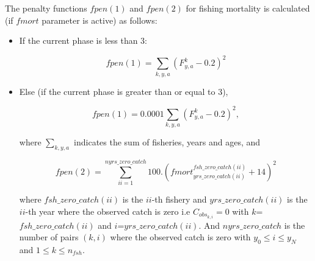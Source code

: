 \documentclass{article}
\begin{document}
The penalty functions $fpen(1)$ and $fpen(2)$ for fishing mortality is calculated (if $fmort$ parameter is active) as follows: 

\begin{itemize}
    \item If the current phase is less than 3:
    
    \begin{equation}
        fpen(1)=\sum_{k,y,a}(F^k_{y,a}-0.2)^2
    \end{equation}
    
    \item Else (if the current phase is greater than or equal to  3), 
    
    \begin{equation}
        fpen(1)=0.0001 \sum_{k,y,a}(F^k_{y,a}-0.2)^2,
    \end{equation}
    
    where $\sum_{k,y,a}$ indicates the sum of fisheries, years and ages, and

\begin{equation}
    fpen(2) = \sum_{ii=1}^{nyrs\_zero\_catch}100.(fmort^{fsh\_zero\_catch(ii)}_{yrs\_zero\_catch(ii)}+14)^2
\end{equation}



where $fsh\_zero\_catch(ii)$ is the $ii$-th fishery and $yrs\_zero\_catch(ii)$ is the $ii$-th year where the observed catch is zero i.e $C_{obs_{k,i}}=0$ with $k$=$fsh\_zero\_catch(ii)$  and $i$=$yrs\_zero\_catch(ii)$. And $nyrs\_zero\_catch$ is the number of pairs $(k,i)$ where the observed catch is zero with $y_0 \leq i \leq y_N$ and $1\leq k \leq n_{fsh}$.

\end{itemize}
\end{document}
